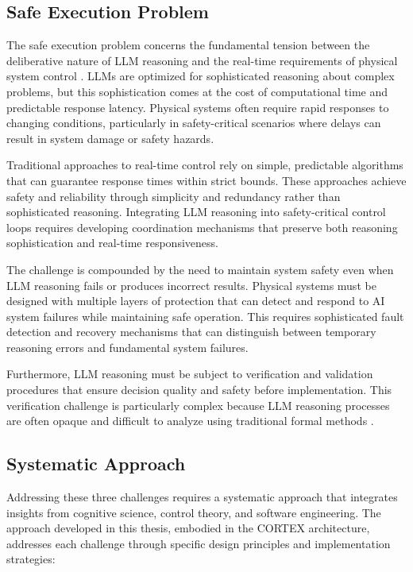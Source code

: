 \subsection{Safe Execution Problem}

The safe execution problem concerns the fundamental tension between the deliberative nature of LLM reasoning and the real-time requirements of physical system control \cite{leveson2011engineering, knight2002safety}. LLMs are optimized for sophisticated reasoning about complex problems, but this sophistication comes at the cost of computational time and predictable response latency. Physical systems often require rapid responses to changing conditions, particularly in safety-critical scenarios where delays can result in system damage or safety hazards.

Traditional approaches to real-time control rely on simple, predictable algorithms that can guarantee response times within strict bounds. These approaches achieve safety and reliability through simplicity and redundancy rather than sophisticated reasoning. Integrating LLM reasoning into safety-critical control loops requires developing coordination mechanisms that preserve both reasoning sophistication and real-time responsiveness.

The challenge is compounded by the need to maintain system safety even when LLM reasoning fails or produces incorrect results. Physical systems must be designed with multiple layers of protection that can detect and respond to AI system failures while maintaining safe operation. This requires sophisticated fault detection and recovery mechanisms that can distinguish between temporary reasoning errors and fundamental system failures.

Furthermore, LLM reasoning must be subject to verification and validation procedures that ensure decision quality and safety before implementation. This verification challenge is particularly complex because LLM reasoning processes are often opaque and difficult to analyze using traditional formal methods \cite{avizienis2004basic, powell1992delta}.

\subsection{Systematic Approach}

Addressing these three challenges requires a systematic approach that integrates insights from cognitive science, control theory, and software engineering. The approach developed in this thesis, embodied in the CORTEX architecture, addresses each challenge through specific design principles and implementation strategies:

